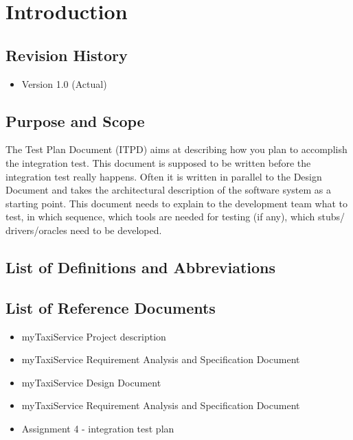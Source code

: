 \section{Introduction}
	\subsection{Revision History}
	\begin{itemize}
		\item Version 1.0 (Actual)
	\end{itemize}
	\subsection{Purpose and Scope}
	The Test Plan Document (ITPD) aims at describing how you plan to accomplish the integration test.
	This document is supposed to be written before the integration test really happens.
	Often it is written in parallel to the Design Document and takes the architectural description of
	the software system as a starting point. This document needs to explain to the development team what
	to test, in which sequence, which tools are needed for testing (if any), which stubs/ drivers/oracles
	need to be developed.
	\subsection{List of Definitions and Abbreviations}
	\subsection{List of Reference Documents}
	\begin{itemize}
		\item myTaxiService Project description
		\item myTaxiService Requirement Analysis and Specification Document
		\item myTaxiService Design Document
		\item myTaxiService Requirement Analysis and Specification Document
		\item Assignment 4 - integration test plan
	\end{itemize}